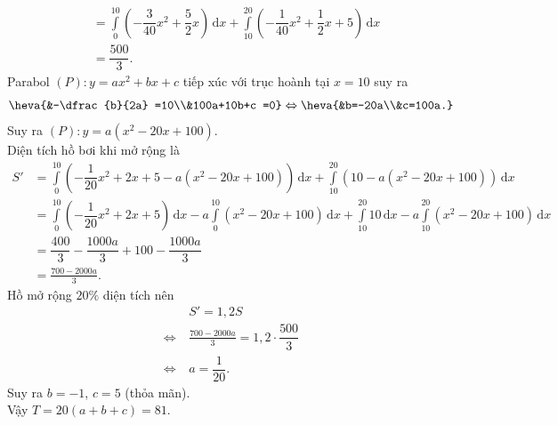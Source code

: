 \begin{ex}
{\begin{align*}
& =\int\limits_0^{10} \left ( -\dfrac{3}{40} x^2+\dfrac{5}{2}x \right ) \mathrm{\,d}x + \int\limits_{10}^{20} \left ( -\dfrac{1}{40} x^2+\dfrac{1}{2} x+5\right ) \mathrm{\,d}x  \\
&= \dfrac{500}{3}.
\end{align*}
Parabol $(P) : y=ax^2+bx+c$ tiếp xúc với trục hoành tại $x=10$ suy ra
\[
\heva{&-\dfrac{b}{2a} =10\\&100a+10b+c =0} \Leftrightarrow \heva{&b=-20a\\&c=100a.}
\]
Suy ra $(P) : y= a(x^2-20x+100)$. \\
Diện tích hồ bơi khi mở rộng là
\begin{align*}
S'  &= \int\limits_0^{10} \left ( -\dfrac{1}{20} x^2+2x+5 - a(x^2-20x+100)\right ) \mathrm{\,d}x + \int\limits_{10}^{20} \left ( 10 - a(x^2-20x+100)\right ) \mathrm{\,d}x  \\
& =\int\limits_{0}^{10} \left (  -\dfrac{1}{20} x^2+2x+5 \right ) \mathrm{\,d}x
- a\int\limits_0^{10} \left ( x^2-20x+100 \right ) \mathrm{\,d}x + \int\limits_{10}^{20} 10 \mathrm{\,d}x
- a\int\limits_{10}^{20}(x^2-20x+100)\mathrm{\,d}x  \\
&= \dfrac{400}{3} - \dfrac{1000a}{3} + 100 - \dfrac{1000a}{3} \\
&= \frac{700-2000 a}{3}.
\end{align*}
Hồ mở rộng $20\%$ diện tích nên
\begin{align*}
& S' = 1{,}2S \\
\Leftrightarrow~& \frac{700-2000 a}{3}= 1{,}2 \cdot \dfrac{500}{3} \\
\Leftrightarrow~& a= \dfrac{1}{20}.
\end{align*}
Suy ra $b=-1$, $c=5$ (thỏa mãn). \\
Vậy $T= 20(a+b+c) =81$.
}
\end{ex}

